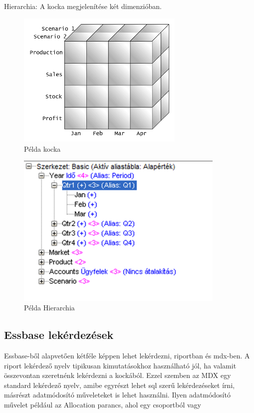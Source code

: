 Hierarchia: A kocka megjelenítése két dimenzióban.

\pagebreak

 \begin{figure}[!ht]
\centering
\includegraphics[width=80mm, keepaspectratio]{figures/cube1.png}
\caption{Példa kocka} 
\label{fig:Cube1}
\end{figure}

 \begin{figure}[!ht]
\centering
\includegraphics[width=100mm, keepaspectratio]{figures/hierarchy.png}
\caption{Példa Hierarchia} 
\label{fig:Cube1}
\end{figure}


\subsection{Essbase lekérdezések}

Essbase-ből alapvetően kétféle képpen lehet lekérdezni, riportban és mdx-ben. A riport lekérdező nyelv tipikusan kimutatásokhoz használható jól, ha valamit összevontan szeretnénk lekérdezni a kockából. Ezzel szemben az MDX egy standard lekérdező nyelv, amibe egyrészt lehet sql szerű lekérdezéseket írni, másrészt adatmódosító műveleteket is lehet használni. Ilyen adatmódosító művelet például az Allocation parancs, ahol egy csoportból vagy  

